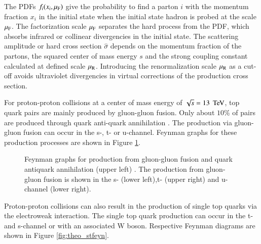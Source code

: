 The PDFs $f_i(x_i,\mu_\mathrm{F})$ give the probability to find a parton $i$ with the momentum fraction $x_i$ in the initial state when the initial state hadron is probed at the scale $\mu_\mathrm{F}$. The factorization scale $\mu_\mathrm{F}$ separates
the hard process from the PDF, which absorbs infrared or collinear divergencies in the initial state. The scattering amplitude or hard cross section $\hat{\sigma}$ depends on the momentum fraction of the partons, the squared 
center of mass energy $s$ and the strong coupling constant \as calculated at defined scale $\mu_\mathrm{R}$. Introducing the renormalization scale $\mu_\mathrm{R}$ as a cut-off avoids ultraviolet divergencies in virtual corrections of the production cross section.

For proton-proton collisions at a center of mass energy of $\sqrt{s}=13\;\,\text{Te\hspace{-.08em}V}$, top quark pairs are mainly produced by gluon-gluon fusion. Only about $10\%$ of \ttbar pairs
are produced through quark anti-quark annihilation \cite{Olive:2016xmw}. The production via gluon-gluon fusion can occur in the s-, t- or u-channel. Feynman graphs for these production processes
are shown in Figure \ref{fig:theo_ttfeyn}.

\begin{figure}[htbp!]
  \begin{center}
\caption{Feynman graphs for \ttbar production from gluon-gluon fusion and quark antiquark annihilation (upper left) \cite{Husemann:2017eka}. The production from gluon-gluon fusion is shown in the s- (lower left),t- (upper right) and u-channel (lower right).
  \label{fig:theo_ttfeyn}}
  \end{center}
\end{figure}

Proton-proton collisions can also result in the production of single top quarks via the electroweak interaction. 
The single top quark production can occur in the t- and s-channel or with an associated W boson. Respective Feynman diagrams are shown in Figure \ref{fig:theo_stfeyn}.


